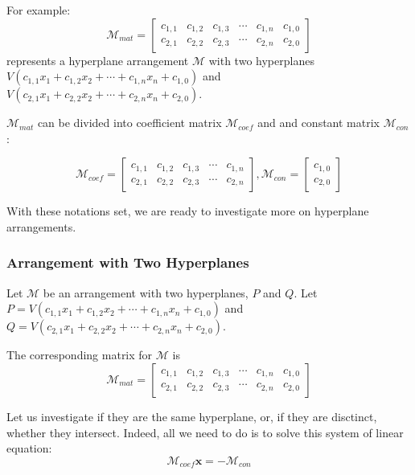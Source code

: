 \documentclass[12pt, a4paper]{article}
\theoremstyle{definition}
\theoremstyle{remark}
\begin{document}
For example:
$$
\mathcal{M}_{mat} = 
\begin{bmatrix}
	c_{1,1} & c_{1,2} & c_{1,3} & \cdots & c_{1,n} & c_{1,0} \\
	c_{2,1} & c_{2,2} & c_{2,3} & \cdots & c_{2,n} & c_{2,0}
\end{bmatrix}
$$
represents a hyperplane arrangement $\mathcal{M}$ with two hyperplanes $V(c_{1,1}x_1 + c_{1,2}x_2 + \cdots + c_{1,n}x_n + c_{1,0})$ and $V(c_{2,1}x_1 + c_{2,2}x_2 + \cdots + c_{2,n}x_n + c_{2,0})$.

$\mathcal{M}_{mat}$ can be divided into coefficient matrix $\mathcal{M}_{coef}$  and and constant matrix $\mathcal{M}_{con}$:

$$
\mathcal{M}_{coef} =
\begin{bmatrix}
	c_{1,1} & c_{1,2} & c_{1,3} & \cdots & c_{1,n} \\
	c_{2,1} & c_{2,2} & c_{2,3} & \cdots & c_{2,n}
\end{bmatrix}
,
\mathcal{M}_{con} =
\begin{bmatrix}
	c_{1,0} \\
	c_{2,0}
\end{bmatrix}
$$

With these notations set, we are ready to investigate more on hyperplane arrangements.

\subsubsection{Arrangement with Two Hyperplanes}

Let $\mathcal{M}$ be an arrangement with two hyperplanes, $P$ and $Q$. 
Let $P = V(c_{1,1}x_1 + c_{1,2}x_2 + \cdots + c_{1,n}x_n + c_{1,0})$ and $Q = V(c_{2,1}x_1 + c_{2,2}x_2 + \cdots + c_{2,n}x_n + c_{2,0})$.

The corresponding matrix for $\mathcal{M}$ is
$$
\mathcal{M}_{mat} = 
\begin{bmatrix}
	c_{1,1} & c_{1,2} & c_{1,3} & \cdots & c_{1,n} & c_{1,0} \\
	c_{2,1} & c_{2,2} & c_{2,3} & \cdots & c_{2,n} & c_{2,0}
\end{bmatrix}
$$

Let us investigate if they are the same hyperplane, or, if they are disctinct, whether they intersect. 
Indeed, all we need to do is to solve this system of linear equation:
\begin{equation}\label{eq:2equation}
	\mathcal{M}_{coef} \bm{x} = - \mathcal{M}_{con}
\end{equation}
\end{document}

